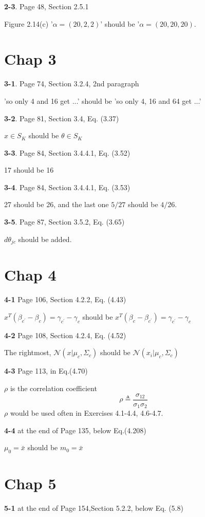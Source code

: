 \documentclass[aps,preprint,a4]{revtex4-1}
\begin{document}
{\color{red}\textbf{2-3}}. Page 48, Section 2.5.1

Figure 2.14(c) '$\alpha = (20,2,2)$' should be '$\alpha = (20,20,20)$.
\section{Chap 3}
{\color{red}\textbf{3-1}}. Page 74, Section 3.2.4, 2nd paragraph

'so only 4 and 16 get ...' should be 'so only 4, 16 and 64 get ...'

{\color{red}\textbf{3-2}}.  Page 81, Section 3.4, Eq. (3.37)

$x\in S_{K}$ should be $\theta \in S_{K}$ 

{\color{red}\textbf{3-3}}.  Page 84, Section 3.4.4.1, Eq. (3.52)

17 should be 16

{\color{red}\textbf{3-4}}.  Page 84, Section 3.4.4.1, Eq. (3.53)

27 should be 26, and the last one $5/27$ should be $4/26$.

{\color{red}\textbf{3-5}}.  Page 87, Section 3.5.2, Eq. (3.65)

$d\theta_{jc}$ should be added.

\section{Chap 4}
{\color{red}\textbf{4-1}} Page 106, Section 4.2.2, Eq. (4.43)

$x^{T}(\beta_{c^{\prime}}-\beta_{c})=\gamma_{c^{\prime}}-\gamma_{c}$
should be
 $x^{T}(\beta_{c}-\beta_{c^{\prime}})=\gamma_{c^{\prime}}-\gamma_{c}$

{\color{red}\textbf{4-2}} Page 108, Section 4.2.4, Eq. (4.52)

The rightmost, $\mathcal N(x|\mu_{c},\Sigma_{c})$ should be
$\mathcal N(x_{i}|\mu_{c},\Sigma_{c})$

{\color{red}\textbf{4-3}} Page 113, in Eq.(4.70)

$\rho$ is the correlation coefficient
\begin{equation}
\rho  \triangleq \frac{\sigma_{12}}{\sigma_{1}\sigma_{2}}
\end{equation}
$\rho$ would be used often in Exercises 4.1-4.4, 4.6-4.7.

{\color{red}\textbf{4-4}} at the end of Page 135, below Eq.(4.208)

$\mu_{0}=\bar{x}$ should be $m_{0}=\bar{x}$

\section{Chap 5}
{\color{red}\textbf{5-1}} at the end of Page 154,Section 5.2.2, below Eq. (5.8)
\end{document}
